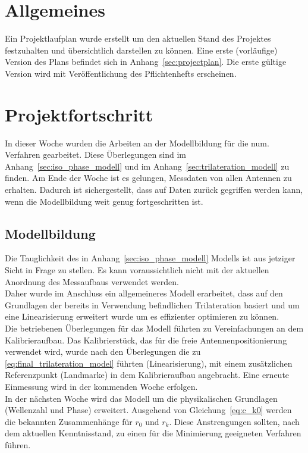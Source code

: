 \documentclass[a4paper,12pt,fleqn]{article}
\begin{document}
\setlength{\headheight}{36pt}

\begin{titlepage}



\end{titlepage}

\section[Allgemeines]{Allgemeines}
Ein Projektlaufplan wurde erstellt um den aktuellen Stand des Projektes festzuhalten und übersichtlich darstellen zu können. Eine erste (vorläufige) Version des Plans befindet sich in Anhang~\ref{sec:projectplan}. Die erste gültige Version wird mit Veröffentlichung des Pflichtenhefts erscheinen.

\section[Fortschritt]{Projektfortschritt}
In dieser Woche wurden die Arbeiten an der Modellbildung für die num. Verfahren gearbeitet. Diese Überlegungen sind im Anhang~\ref{sec:iso_phase_modell} und im Anhang~\ref{sec:trilateration_modell} zu finden.
Am Ende der Woche ist es gelungen, Messdaten von allen Antennen zu erhalten. Dadurch ist sichergestellt, dass auf Daten zurück gegriffen werden kann, wenn die Modellbildung weit genug fortgeschritten ist. 

\subsection{Modellbildung}
Die Tauglichkeit des in Anhang~\ref{sec:iso_phase_modell} Modells ist aus jetziger Sicht in Frage zu stellen. Es kann voraussichtlich nicht mit der aktuellen Anordnung des Messaufbaus verwendet werden.\\
Daher wurde im Anschluss ein allgemeineres Modell erarbeitet, dass auf den Grundlagen der bereits in Verwendung befindlichen Trilateration basiert und um eine Linearisierung erweitert wurde um es effizienter optimieren zu können.\\
Die betriebenen Überlegungen für das Modell führten zu Vereinfachungen an dem Kalibrieraufbau. Das Kalibrierstück, das für die freie Antennenpositionierung verwendet wird, wurde nach den Überlegungen die zu \eqref{eq:final_trilateration_model}  führten (Linearisierung), mit einem zusätzlichen Referenzpunkt (Landmarke) in dem Kalibrieraufbau angebracht. Eine erneute Einmessung wird in der kommenden Woche erfolgen.\\
In der nächsten Woche wird das Modell um die physikalischen Grundlagen (Wellenzahl und Phase) erweitert. Ausgehend von Gleichung~\eqref{eq:c_k0} werden die bekannten Zusammenhänge für $r_0$ und $r_k$. Diese Anstrengungen sollten, nach dem aktuellen Kenntnisstand, zu einen für die Minimierung geeigneten Verfahren führen.
\end{document}
